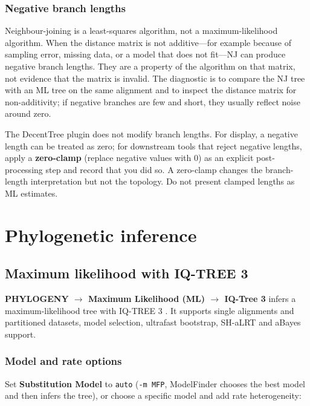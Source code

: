 \documentclass[10pt]{report}
\begin{document}
\subsection{Negative branch lengths}

Neighbour-joining is a least-squares algorithm, not a maximum-likelihood
algorithm. When the distance matrix is not additive---for example because of
sampling error, missing data, or a model that does not fit---NJ can produce
negative branch lengths. They are a property of the algorithm on that matrix,
not evidence that the matrix is invalid. The diagnostic is to compare the NJ
tree with an ML tree on the same alignment and to inspect the distance matrix
for non-additivity; if negative branches are few and short, they usually
reflect noise around zero.

The DecentTree plugin does not modify branch lengths. For display, a negative
length can be treated as zero; for downstream tools that reject negative
lengths, apply a \textbf{zero-clamp} (replace negative values with 0) as an
explicit post-processing step and record that you did so. A zero-clamp changes
the branch-length interpretation but not the topology. Do not present clamped
lengths as ML estimates.

\chapter{Phylogenetic inference}

\section{Maximum likelihood with IQ-TREE 3}

\textbf{PHYLOGENY $\rightarrow$ Maximum Likelihood (ML) $\rightarrow$ IQ-Tree
3} infers a maximum-likelihood tree with IQ-TREE 3 \cite{iqtree3}. It supports single
alignments and partitioned datasets, model selection, ultrafast bootstrap,
SH-aLRT and aBayes support.

\subsection{Model and rate options}

Set \textbf{Substitution Model} to \texttt{auto} (\texttt{-m MFP}, ModelFinder
chooses the best model and then infers the tree), or choose a specific model
and add rate heterogeneity:
\end{document}
